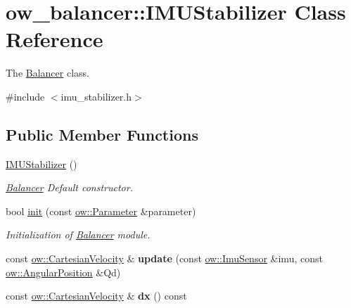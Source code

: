 \hypertarget{classow__balancer_1_1IMUStabilizer}{}\section{ow\+\_\+balancer\+:\+:I\+M\+U\+Stabilizer Class Reference}
\label{classow__balancer_1_1IMUStabilizer}


The \hyperlink{classow__balancer_1_1Balancer}{Balancer} class.  




{\ttfamily \#include $<$imu\+\_\+stabilizer.\+h$>$}

\subsection*{Public Member Functions}
\begin{DoxyCompactItemize}
\item 
\hyperlink{classow__balancer_1_1IMUStabilizer_a5aeb1a996bd6ae395c4bd1e1039e0a97}{I\+M\+U\+Stabilizer} ()\hypertarget{classow__balancer_1_1IMUStabilizer_a5aeb1a996bd6ae395c4bd1e1039e0a97}{}\label{classow__balancer_1_1IMUStabilizer_a5aeb1a996bd6ae395c4bd1e1039e0a97}

\begin{DoxyCompactList}\small\item\em \hyperlink{classow__balancer_1_1Balancer}{Balancer} Default constructor. \end{DoxyCompactList}\item 
bool \hyperlink{classow__balancer_1_1IMUStabilizer_a3ca7f0a6f1c0eafc2494b1b041d6f105}{init} (const \hyperlink{classow_1_1Parameter}{ow\+::\+Parameter} \&parameter)\hypertarget{classow__balancer_1_1IMUStabilizer_a3ca7f0a6f1c0eafc2494b1b041d6f105}{}\label{classow__balancer_1_1IMUStabilizer_a3ca7f0a6f1c0eafc2494b1b041d6f105}

\begin{DoxyCompactList}\small\item\em Initialization of \hyperlink{classow__balancer_1_1Balancer}{Balancer} module. \end{DoxyCompactList}\item 
const \hyperlink{classow__core_1_1CartesianVelocity}{ow\+::\+Cartesian\+Velocity} \& {\bfseries update} (const \hyperlink{classow__core_1_1InertialMeasurmentUnitSensor}{ow\+::\+Imu\+Sensor} \&imu, const \hyperlink{classow__core_1_1AngularPosition}{ow\+::\+Angular\+Position} \&Qd)\hypertarget{classow__balancer_1_1IMUStabilizer_a6a3d157d6adcb2f19dddc7256b58ffc6}{}\label{classow__balancer_1_1IMUStabilizer_a6a3d157d6adcb2f19dddc7256b58ffc6}

\item 
const \hyperlink{classow__core_1_1CartesianVelocity}{ow\+::\+Cartesian\+Velocity} \& {\bfseries dx} () const \hypertarget{classow__balancer_1_1IMUStabilizer_a9c38ba683b24d1131b314dac64a6efd5}{}\label{classow__balancer_1_1IMUStabilizer_a9c38ba683b24d1131b314dac64a6efd5}

\end{DoxyCompactItemize}
